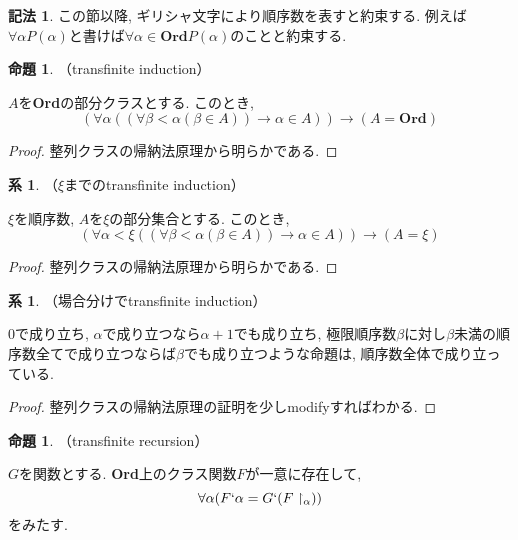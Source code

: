 \documentclass[a4paper, twoside]{bxjsarticle}
\theoremstyle{definition}
\newtheorem{prop}[thm]{命題}
\newtheorem{cor}[thm]{系}
\newtheorem{notation}[thm]{記法}
\begin{document}
    \begin{notation}
        この節以降, ギリシャ文字により順序数を表すと約束する. 例えば$\forall \alpha P(\alpha)$と書けば$\forall \alpha\in \textbf{Ord} P(\alpha)$のことと約束する. 
    \end{notation}
    \begin{prop}
        （transfinite induction）
    
         $A$を\textbf{Ord}の部分クラスとする. このとき, \[(\forall \alpha ((\forall \beta < \alpha (\beta\in A))\to \alpha\in A))\to (A=\textbf{Ord})\]
    \end{prop}
    \begin{proof}
        整列クラスの帰納法原理から明らかである.
    \end{proof}
    \begin{cor}
        （$\xi$までのtransfinite induction）
    
        $\xi$を順序数, $A$を$\xi$の部分集合とする. このとき, \[(\forall \alpha<\xi ((\forall \beta < \alpha (\beta\in A))\to \alpha\in A))\to (A=\xi)\]
    \end{cor}
    \begin{proof}
        整列クラスの帰納法原理から明らかである.
    \end{proof}
    \begin{cor}
        （場合分けでtransfinite induction）
        
            $0$で成り立ち, $\alpha$で成り立つなら$\alpha+1$でも成り立ち, 極限順序数$\beta$に対し$\beta$未満の順序数全てで成り立つならば$\beta$でも成り立つような命題は, 順序数全体で成り立っている.
    \end{cor}
    \begin{proof}
        整列クラスの帰納法原理の証明を少しmodifyすればわかる.
    \end{proof}
    \begin{prop}
        （transfinite recursion）
        
        $G$を関数とする. \textbf{Ord}上のクラス関数$F$が一意に存在して, \[\forall \alpha(F`\alpha = G`(F\restriction_\alpha))\]をみたす.
    \end{prop}
\end{document}
